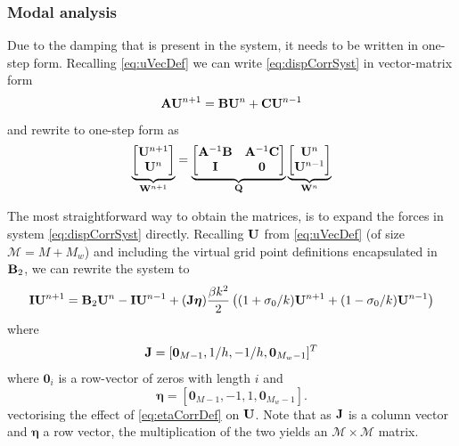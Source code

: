 \subsubsection{Modal analysis}
Due to the damping that is present in the system, it needs to be written in one-step form. Recalling \eqref{eq:uVecDef} we can write \eqref{eq:dispCorrSyst} in vector-matrix form
\begin{equation}\label{eq:formForOneStep}
    \mathbf{A} \mathbf{U}^{n+1} = \mathbf{B} \mathbf{U}^n + \mathbf{C}\mathbf{U}^{n-1}
\end{equation}
and rewrite to one-step form as \SWcomment[decapitalise u!]
\begin{equation}\label{eq:oneStepFormDynamicGrid}
    \underbrace{\begin{bmatrix}
        \mathbf{U}^{n+1}\\
        \mathbf{U}^n
    \end{bmatrix}}_{\mathbf{W}^{n+1}} = 
    \underbrace{\begin{bmatrix}
        \mathbf{A}^{-1}\mathbf{B} & \mathbf{A}^{-1}\mathbf{C}\\
        \mathbf{I} & \mathbf{0}
    \end{bmatrix}}_{\mathbf{Q}}
    \underbrace{\begin{bmatrix}
        \mathbf{U}^n\\
        \mathbf{U}^{n-1}
    \end{bmatrix}}_{\mathbf{W}^n}
\end{equation}

The most straightforward way to obtain the matrices, is to expand the forces in system \eqref{eq:dispCorrSyst} directly. 
Recalling $\mathbf{U}$ from \eqref{eq:uVecDef} (of size $\mathcal{M} = M+M_w$) and including the virtual grid point definitions encapsulated in $\mathbf{B}_2$, we can rewrite the system to
\begin{equation}
    \mathbf{I}\mathbf{U}^{n+1} = \mathbf{B}_2\mathbf{U}^n - \mathbf{I}\mathbf{U}^{n-1} + (\mathbf{J}\boldsymbol{\eta})\frac{\beta k^2}{2}\left((1+\sigma_0/k)\mathbf{U}^{n+1} + (1-\sigma_0/k)\mathbf{U}^{n-1}\right)
\end{equation}
where 
\begin{equation}
    \mathbf{J} = [\mathbf{0}_{M-1}, 1/h, -1/h, \mathbf{0}_{M_w-1}]^T
\end{equation}
where $\mathbf{0}_i$ is a row-vector of zeros with length $i$ and
\begin{equation}
    \boldsymbol{\eta} = [\mathbf{0}_{M-1}, -1, 1, \mathbf{0}_{M_w-1}].
\end{equation}
vectorising the effect of \eqref{eq:etaCorrDef} on $\mathbf{U}$. Note that as $\mathbf{J}$ is a column vector and $\boldsymbol{\eta}$ a row vector, the multiplication of the two yields an $\mathcal{M}\times\mathcal{M}$ matrix.


